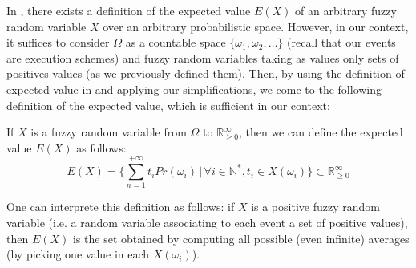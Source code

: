 \documentclass[a4paper,10pt]{llncs}
\def\NN {{\mathbb N}}
\def\RRposi {{\mathbb R_{\geq 0}^{\infty}}}
\begin{document}
In \cite{PuriRal86}, there exists a definition of the expected value $E(X)$ of an arbitrary fuzzy random variable $X$ over an arbitrary probabilistic space. However, in our context, it suffices to consider $\Omega$ as a countable space $\{\omega_1, \omega_2, \dots \}$ (recall that our events are execution schemes) and fuzzy random variables taking as values only sets of positives values (as we previously defined them). Then, by using the definition of expected value in \cite{PuriRal86} and applying our simplifications, we come to the following definition of the expected value, which is sufficient in our context:

\begin{definition}
If $X$ is a fuzzy random variable from $\Omega$ to $\RRposi$, then we can define the expected value $E(X)$ as follows:
$$E(X) = \{ \sum_{n = 1}^{+\infty} t_iPr(\omega_i) \,|\, \forall i \in \NN^*, t_i \in X(\omega_i) \} \subset \RRposi$$
\end{definition}
One can interprete this definition as follows: if $X$ is a positive fuzzy random variable (i.e. a random variable associating to each event a set of positive values), then $E(X)$ is the set obtained by computing all possible (even infinite) averages (by picking one value in each $X(\omega_i)$).

%
\end{document}
